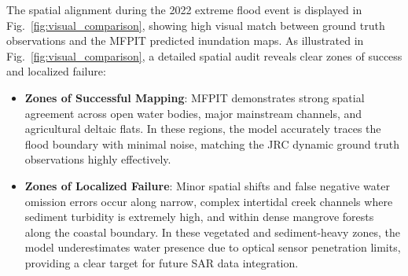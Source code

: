 \documentclass[preprint,12pt]{elsarticle}
\begin{document}
\begin{table}[htbp]
\caption{Verified Year-by-Year Evaluation Across the 2020--2023 Hydrological Epochs ($n = 98$ Patches per Year)}
\label{tab:extreme_events}
\centering
{}
\end{table}

The spatial alignment during the 2022 extreme flood event is displayed in Fig.~\ref{fig:visual_comparison}, showing high visual match between ground truth observations and the MFPIT predicted inundation maps. As illustrated in Fig.~\ref{fig:visual_comparison}, a detailed spatial audit reveals clear zones of success and localized failure:
\begin{itemize}
    \item \textbf{Zones of Successful Mapping}: MFPIT demonstrates strong spatial agreement across open water bodies, major mainstream channels, and agricultural deltaic flats. In these regions, the model accurately traces the flood boundary with minimal noise, matching the JRC dynamic ground truth observations highly effectively.
    \item \textbf{Zones of Localized Failure}: Minor spatial shifts and false negative water omission errors occur along narrow, complex intertidal creek channels where sediment turbidity is extremely high, and within dense mangrove forests along the coastal boundary. In these vegetated and sediment-heavy zones, the model underestimates water presence due to optical sensor penetration limits, providing a clear target for future SAR data integration.
\end{itemize}
\end{document}
